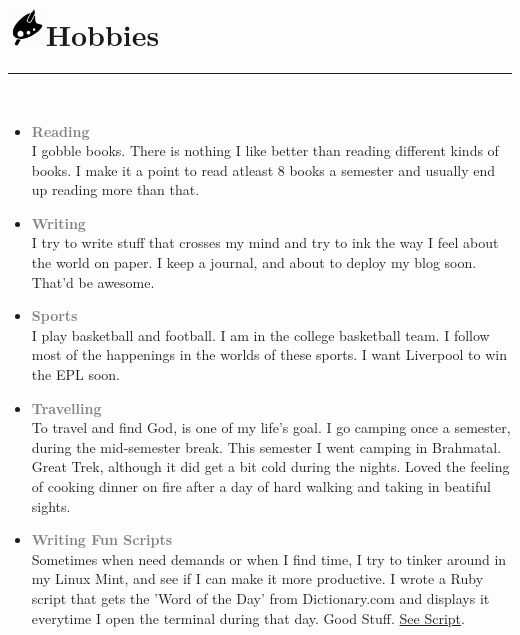 \documentclass{article}
\begin{document}
	\section*{\includegraphics[width=1cm]{buttons/hobbies.png}Hobbies}
		\textcolor[RGB]{220,220,220}{\rule{\linewidth}{0.3pt}}\\
		\vspace{10pt}
		\begin{itemize}
			\item \fontsize{14}{50}\textbf{ \textcolor{Gray}{Reading}}\\
				I gobble books. There is nothing I like better than reading different kinds of books. I make it a point to read atleast 8 books a semester and usually end up reading more than that.
			\item \fontsize{14}{50}\textbf{ \textcolor{Gray}{Writing}}\\
				I try to write stuff that crosses my mind and try to ink the way I feel about the world on paper. I keep a journal, and about to deploy my blog soon. That'd be awesome.
			\item 	\fontsize{14}{50}\textbf{ \textcolor{Gray}{Sports}}\\
				I play basketball and football. I am in the college basketball team. I follow most of the happenings in the worlds of these sports. I want Liverpool to win the EPL soon. 
			\item \fontsize{14}{50}\textbf{ \textcolor{Gray}{Travelling}}\\
				To travel and find God, is one of my life's goal. I go camping once a semester, during the mid-semester break. This semester I went camping in Brahmatal. Great Trek, although it did get a bit cold during the nights. Loved the feeling of cooking dinner on fire after a day of hard walking and taking in beatiful sights.
			\item \fontsize{14}{50}\textbf{ \textcolor{Gray}{Writing Fun Scripts}}\\
				Sometimes when need demands or when I find time, I try to tinker around in my Linux Mint, and see if I can make it more productive. I wrote a \textcolor{BrickRed}{Ruby} script that gets the 'Word of the Day' from Dictionary.com and displays it everytime I open the terminal during that day. Good Stuff. \href{URL}{See Script}.
		\end{itemize}
		
\end{document}
